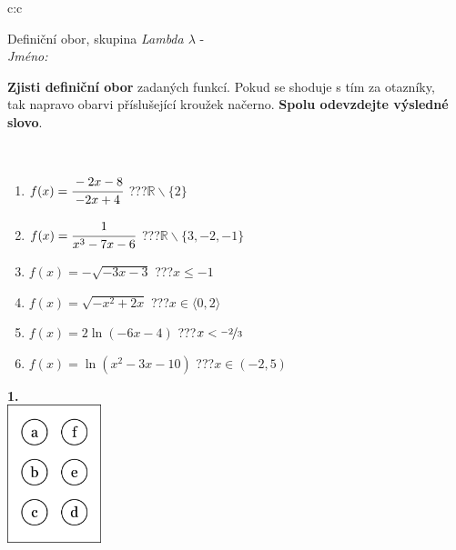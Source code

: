 \documentclass[10pt]{report}
\begin{document}
\begin{tabular}{c:c}
\begin{minipage}[c][104.5mm][t]{0.5\linewidth}
\begin{center}
\vspace{7mm}
{\huge Definiční obor, skupina \textit{Lambda $\lambda$} -}\\[5mm]
\textit{Jméno:}\phantom{xxxxxxxxxxxxxxxxxxxxxxxxxxxxxxxxxxxxxxxxxxxxxxxxxxxxxxxxxxxxxxxxx}\\[5mm]
\begin{minipage}{0.95\linewidth}
\begin{center}
\textbf{Zjisti definiční obor} zadaných funkcí. Pokud se shoduje s tím za otazníky,\\tak napravo obarvi příslušející kroužek načerno. \textbf{Spolu odevzdejte výsledné slovo}.
\end{center}
\end{minipage}
\\[1mm]
\begin{minipage}{0.79\linewidth}
\begin{center}
\begin{varwidth}{\linewidth}
\begin{enumerate}
\normalsizerrr
\item $f(x)=\cfrac{-2x-8}{-2x+4}$\quad \dotfill\; ???\;\dotfill \quad $\mathbb{R}\smallsetminus\{2\}$
\item $f(x)=\cfrac{1}{x^3-7x-6}$\quad \dotfill\; ???\;\dotfill \quad $\mathbb{R}\smallsetminus\{3,-2,-1\}$
\item $f(x)=-\sqrt{-3x-3}$\quad \dotfill\; ???\;\dotfill \quad $x\leq-1$
\item $f(x)=\sqrt{-x^2+2x}$\quad \dotfill\; ???\;\dotfill \quad $x\in\langle0 , 2\rangle$
\item $f(x)=2\ln{(-6x-4)}$\quad \dotfill\; ???\;\dotfill \quad $x<\nicefrac{-2}{3}$
\item $f(x)=\ln{(x^2-3x-10)}$\quad \dotfill\; ???\;\dotfill \quad $x\in(-2 , 5)$
\end{enumerate}
\end{varwidth}
\end{center}
\end{minipage}
\begin{minipage}{0.20\linewidth}
\begin{center}
{\Huge\bfseries 1.} \\[2mm]
\includegraphics[height=40mm]{../images/braille.png}

\end{center}
\end{minipage}
\end{center}
\end{minipage}
\end{tabular}
\end{document}
